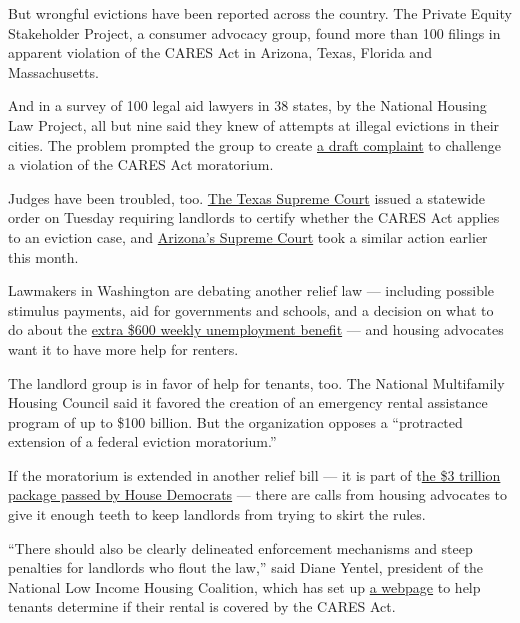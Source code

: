 But wrongful evictions have been reported across the country. The
Private Equity Stakeholder Project, a consumer advocacy group, found
more than 100 filings in apparent violation of the CARES Act in Arizona,
Texas, Florida and Massachusetts.

And in a survey of 100 legal aid lawyers in 38 states, by the National
Housing Law Project, all but nine said they knew of attempts at illegal
evictions in their cities. The problem prompted the group to create
\href{https://www.nhlp.org/campaign/protecting-renter-and-homeowner-rights-during-our-national-health-crisis-2/}{a
draft complaint} to challenge a violation of the CARES Act moratorium.

Judges have been troubled, too.
\href{http://www.txcourts.gov/media/1449329/209086.pdf}{The Texas
Supreme Court} issued a statewide order on Tuesday requiring landlords
to certify whether the CARES Act applies to an eviction case, and
\href{http://www.azcourts.gov/Portals/22/admorder/Orders20/2020-105Final.pdf?ver=2020-07-07-153304-167}{Arizona's
Supreme Court} took a similar action earlier this month.

Lawmakers in Washington are debating another relief law --- including
possible stimulus payments, aid for governments and schools, and a
decision on what to do about the
\href{https://www.nytimes.com/2020/07/21/business/economy/coronavirus-unemployment-benefits.html}{extra
\$600 weekly unemployment benefit} --- and housing advocates want it to
have more help for renters.

The landlord group is in favor of help for tenants, too. The National
Multifamily Housing Council said it favored the creation of an emergency
rental assistance program of up to \$100 billion. But the organization
opposes a ``protracted extension of a federal eviction moratorium.''

If the moratorium is extended in another relief bill --- it is part of
t\href{https://www.congress.gov/bill/116th-congress/house-bill/6800/text}{he
\$3 trillion package passed by House Democrats} --- there are calls from
housing advocates to give it enough teeth to keep landlords from trying
to skirt the rules.

``There should also be clearly delineated enforcement mechanisms and
steep penalties for landlords who flout the law,'' said Diane Yentel,
president of the National Low Income Housing Coalition, which has set up
\href{https://nlihc.org/federal-moratoriums}{a webpage} to help tenants
determine if their rental is covered by the CARES Act.

